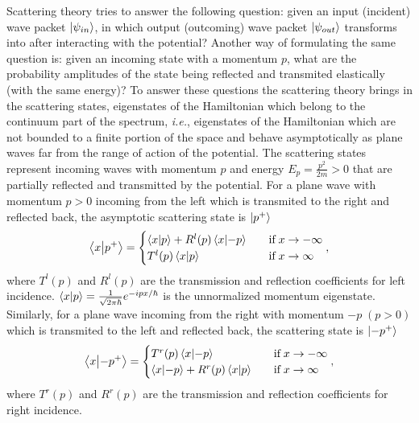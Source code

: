 Scattering theory tries to answer the following question: given an input (incident) wave packet $\ket{\psi_{in}}$, in which output (outcoming) wave packet $\ket{\psi_{out}}$ transforms into after interacting with the potential? Another way of formulating the same question is: given an incoming state with a momentum $p$, what are the probability amplitudes of the state being reflected and transmited elastically (with the same energy)? To answer these questions the scattering theory brings in the scattering states, eigenstates of the Hamiltonian which belong to the continuum part of the spectrum, \textit{i.e.}, eigenstates of the Hamiltonian which are not bounded to a finite portion of the space and behave asymptotically as plane waves far from the range of action of the potential. The scattering states represent incoming waves with momentum $p$ and energy $E_p = \frac{p^2}{2m}>0$ that are partially reflected and transmitted by the potential. For a plane wave with momentum $p>0$ incoming from the left which is transmited to the right and reflected back, the asymptotic scattering state is $\ket{p^+}$
%
\begin{equation}
  \braket{x}{p^+} =
  \begin{cases}
    \braket{x}{p} + R^l(p)\braket{x}{-p} \quad &\text{if}\; x \to -\infty
    \\
    T^l(p) \braket{x}{p} \quad &\text{if}\; x \to \infty
  \end{cases},
  \label{eq:chapter1_leftState}
\end{equation}
%
where $T^l(p)$ and $R^l(p)$ are the transmission and reflection coefficients for left incidence. $\braket{x}{p} = \frac{1}{ \sqrt{2\pi\hbar} } e^{-i p x /\hbar} $ is the unnormalized momentum eigenstate. Similarly, for a plane wave incoming from the right with momentum $-p \;(p>0)$ which is transmited to the left and reflected back, the scattering state is $\ket{-p^+}$
%
\begin{equation}
  \braket{x}{-p^+} =
  \begin{cases}
    T^r(p) \braket{x}{-p} \quad &\text{if}\; x \to -\infty
    \\
    \braket{x}{-p} + R^r(p)\braket{x}{p} \quad &\text{if}\; x \to \infty
  \end{cases},
  \label{eq:chapter1_rightState}
\end{equation}
%
where $T^r(p)$ and $R^r(p)$ are the transmission and reflection coefficients for right incidence. %
